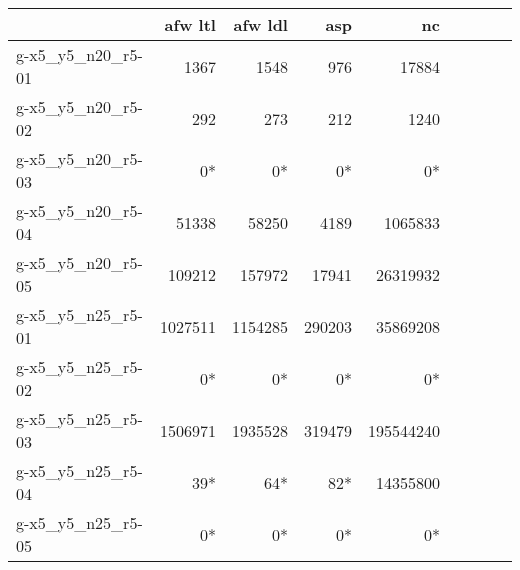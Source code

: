 \begin{tabular}{|l|r|r|r|r|r|r|r|r|}
\hline
{} &  \textbf{afw ltl}&    \textbf{afw ldl} &    \textbf{asp} &    \textbf{nc}  \\
\hline

g-x5\_y5\_n20\_r5-01 &                     1367 &                         1548 &                      976 &                   17884 \\
g-x5\_y5\_n20\_r5-02 &                      292 &                          273 &                      212 &                    1240 \\
g-x5\_y5\_n20\_r5-03 &                        0* &                            0* &                        0* &                       0* \\
g-x5\_y5\_n20\_r5-04 &                    51338 &                        58250 &                     4189 &                 1065833 \\
g-x5\_y5\_n20\_r5-05 &                   109212 &                       157972 &                    17941 &                26319932 \\ 
\hline
\hline
g-x5\_y5\_n25\_r5-01 &                  1027511 &                      1154285 &                   290203 &                35869208 \\
g-x5\_y5\_n25\_r5-02 &                        0* &                            0* &                        0* &                       0* \\
g-x5\_y5\_n25\_r5-03 &                  1506971 &                      1935528 &                   319479 &               195544240 \\
g-x5\_y5\_n25\_r5-04 &                       39* &                           64* &                       82* &                14355800 \\
g-x5\_y5\_n25\_r5-05 &                        0* &                            0* &                        0* &                       0* \\
\hline
\end{tabular}
